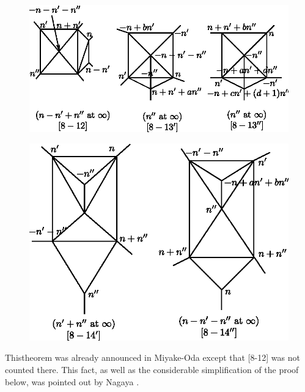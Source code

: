 \begin{theorem}
\begin{figure}[H]
\end{figure}
\begin{figure}[H]
\centering 
\includegraphics{vol58-fig/fig58-39.eps} 
\end{figure}
\begin{figure}[H]
\centering 
\includegraphics{vol58-fig/fig58-40.eps} 
\end{figure}

\end{theorem}

\begin{remark*} 
This\pageoriginale theorem was already announced in Miyake-Oda \cite{keyMO}
except that [8-12] was not counted there. This fact, as well as the
considerable simplification of the proof below, was pointed out by
Nagaya \cite{keyN2}.  
\end{remark*}

